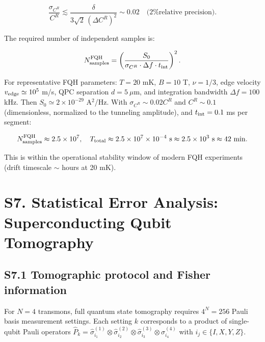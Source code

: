 \documentclass[prd,aps,showpacs,superscriptaddress,twocolumn]{revtex4-2}
\begin{document}
\begin{equation}
\frac{\sigma_{C^R}}{C^R} \lesssim \frac{\delta}{3\sqrt{2} \, (\Delta C^R)^2} \sim 0.02 \quad \text{(2\% relative precision)}.
\label{eq:FQH_precision}
\end{equation}

The required number of independent samples is:

\begin{equation}
N_{\rm samples}^{\rm FQH} = \left(\frac{S_0}{\sigma_{C^R} \cdot \Delta f \cdot t_{\rm int}}\right)^2.
\label{eq:FQH_Nsamples}
\end{equation}

For representative FQH parameters: $T = 20$ mK, $B = 10$ T, $\nu = 1/3$, edge velocity $v_{\rm edge} \simeq 10^5$ m/s, QPC separation $d = 5\ \mu$m, and integration bandwidth $\Delta f = 100$ kHz. Then $S_0 \simeq 2 \times 10^{-29}$ A$^2$/Hz. With $\sigma_{C^R} \sim 0.02 C^R$ and $C^R \sim 0.1$ (dimensionless, normalized to the tunneling amplitude), and $t_{\rm int} = 0.1$ ms per segment:

\begin{equation}
N_{\rm samples}^{\rm FQH} \approx 2.5 \times 10^7, \quad T_{\rm total} \approx 2.5 \times 10^7 \times 10^{-4}\ {\rm s} \approx 2.5 \times 10^3\ {\rm s} \approx 42\ {\rm min}.
\label{eq:FQH_time}
\end{equation}

This is within the operational stability window of modern FQH experiments (drift timescale $\sim$ hours at 20 mK).

\section{S7. Statistical Error Analysis: Superconducting Qubit Tomography}

\subsection{S7.1 Tomographic protocol and Fisher information}

For $N = 4$ transmons, full quantum state tomography requires $4^N = 256$ Pauli basis measurement settings. Each setting $k$ corresponds to a product of single-qubit Pauli operators $\hat{P}_k = \hat{\sigma}_{i_1}^{(1)} \otimes \hat{\sigma}_{i_2}^{(2)} \otimes \hat{\sigma}_{i_3}^{(3)} \otimes \hat{\sigma}_{i_4}^{(4)}$ with $i_j \in \{I, X, Y, Z\}$.
\end{document}

